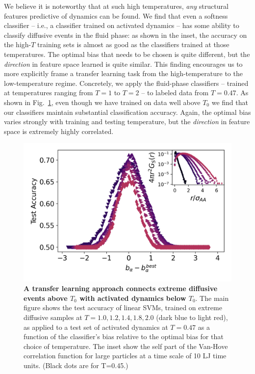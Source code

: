 \documentclass[aps,reprint,superscriptaddress,nofootinbib, notitlepage,prl]{revtex4-2}
\begin{document}
We believe it is noteworthy that at such high temperatures, \emph{any} structural features predictive of dynamics can be found. We find that even a softness classifier -- i.e., a classifier trained on activated dynamics -- has some ability to classify diffusive events in the fluid phase: as shown in the inset, the accuracy on the high-$T$ training sets is almost as good as the classifiers trained at those temperatures. The optimal bias that needs to be chosen is quite different, but the \emph{direction} in feature space learned is quite similar. This finding encourages us to more explicitly frame a transfer learning task from the high-temperature to the low-temperature regime. Concretely, we apply the fluid-phase classifiers -- trained at temperatures ranging from $T=1$ to $T=2$ -- to labeled data from $T=0.47$. As shown in Fig.~\ref{fig:transferLearning}, even though we have trained on data well above $T_0$ we find that our classifiers maintain substantial classification accuracy. Again, the optimal bias varies strongly with training and testing temperature, but the \emph{direction} in feature space is extremely highly correlated. 

\begin{figure}[t!]
    \centering
    \includegraphics[width =1.\linewidth]{Figure_2.png}
    \caption{ \textbf{A transfer learning approach connects extreme diffusive events above $T_0$ with activated dynamics below $T_0$}.  The main figure shows the test accuracy  of linear SVMs, trained on extreme diffusive samples at $T=1.0,1.2,1.4,1.8,2.0$ (dark blue to light red), as applied to a test set of activated dynamics at $T=0.47$ as a function of the classifier's bias relative to the optimal bias for that choice of temperature. The inset show the self part of the Van-Hove correlation function for large particles at a time scale of 10 LJ time units. (Black dots are for T=0.45.)}
    \label{fig:transferLearning}
\end{figure}
\end{document}
